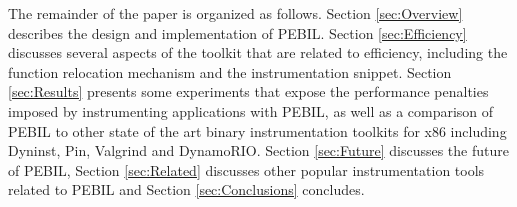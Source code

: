 The remainder of the paper is organized as follows. Section
\ref{sec:Overview} describes the design and implementation of PEBIL.
Section \ref{sec:Efficiency} discusses
several aspects of the toolkit that are related to efficiency, including the function relocation mechanism and the
instrumentation snippet. Section \ref{sec:Results} presents some
experiments that expose the performance penalties imposed by instrumenting applications with PEBIL, as well as
a comparison of PEBIL to other state of the art binary instrumentation toolkits for x86 including Dyninst, Pin, Valgrind and DynamoRIO. Section
\ref{sec:Future} discusses the future of PEBIL, Section \ref{sec:Related} discusses 
other popular instrumentation tools related to PEBIL and Section \ref{sec:Conclusions} concludes.
